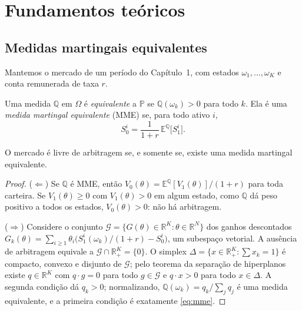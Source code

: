 \section{Fundamentos teóricos}

\subsection{Medidas martingais equivalentes}

Mantemos o mercado de um período do Capítulo~1, com estados $\omega_1,\dots,\omega_K$ e conta remunerada de taxa $r$.

\begin{definicao}
Uma medida $\mathbb Q$ em $\Omega$ é \emph{equivalente} a $\mathbb P$ se $\mathbb Q(\omega_k)>0$ para todo $k$. Ela é uma \emph{medida martingal equivalente} (MME) se, para todo ativo $i$,
\begin{equation}\label{eq:mme}
S^i_0=\frac{1}{1+r}\,\mathbb E^{\mathbb Q}\big[S^i_1\big].
\end{equation}
\end{definicao}

\begin{teorema}\label{teo:ftap1}
O mercado é livre de arbitragem se, e somente se, existe uma medida martingal equivalente.
\end{teorema}

\begin{proof}
($\Leftarrow$) Se $\mathbb Q$ é MME, então $V_0(\theta)=\mathbb E^{\mathbb Q}[V_1(\theta)]/(1+r)$ para toda carteira. Se $V_1(\theta)\ge0$ com $V_1(\theta)>0$ em algum estado, como $\mathbb Q$ dá peso positivo a todos os estados, $V_0(\theta)>0$: não há arbitragem.

($\Rightarrow$) Considere o conjunto $\mathcal G=\{G(\theta)\in\mathbb R^K:\theta\in\mathbb R^{N}\}$ dos ganhos descontados $G_k(\theta)=\sum_{i\ge1}\theta_i\big(S^i_1(\omega_k)/(1+r)-S^i_0\big)$, um subespaço vetorial. A ausência de arbitragem equivale a $\mathcal G\cap\mathbb R^K_+=\{0\}$. O simplex $\Delta=\{x\in\mathbb R^K_+:\sum x_k=1\}$ é compacto, convexo e disjunto de $\mathcal G$; pelo teorema da separação de hiperplanos existe $q\in\mathbb R^K$ com $q\cdot g=0$ para todo $g\in\mathcal G$ e $q\cdot x>0$ para todo $x\in\Delta$. A segunda condição dá $q_k>0$; normalizando, $\mathbb Q(\omega_k)=q_k/\sum_jq_j$ é uma medida equivalente, e a primeira condição é exatamente \eqref{eq:mme}.
\end{proof}

